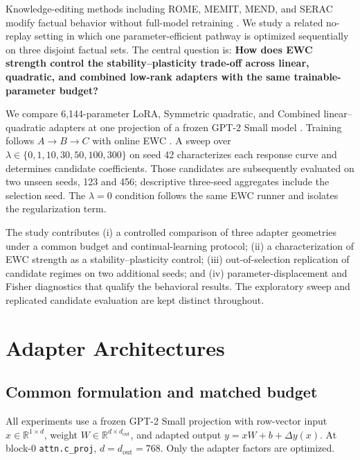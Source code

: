 \documentclass[12pt,a4paper]{article}
\begin{document}
Knowledge-editing methods including ROME, MEMIT, MEND, and SERAC modify factual behavior without full-model retraining \cite{ref9,ref10,ref11,ref12}. We study a related no-replay setting in which one parameter-efficient pathway is optimized sequentially on three disjoint factual sets. The central question is: \textbf{How does EWC strength control the stability–plasticity trade-off across linear, quadratic, and combined low-rank adapters with the same trainable-parameter budget?}

We compare 6,144-parameter LoRA, Symmetric quadratic, and Combined linear–quadratic adapters at one projection of a frozen GPT-2 Small model \cite{ref3}. Training follows \(A\rightarrow B\rightarrow C\) with online EWC \cite{ref1}. A sweep over \(\lambda\in\{0,1,10,30,50,100,300\}\) on seed 42 characterizes each response curve and determines candidate coefficients. Those candidates are subsequently evaluated on two unseen seeds, 123 and 456; descriptive three-seed aggregates include the selection seed. The \(\lambda=0\) condition follows the same EWC runner and isolates the regularization term.

The study contributes (i) a controlled comparison of three adapter geometries under a common budget and continual-learning protocol; (ii) a characterization of EWC strength as a stability–plasticity control; (iii) out-of-selection replication of candidate regimes on two additional seeds; and (iv) parameter-displacement and Fisher diagnostics that qualify the behavioral results. The exploratory sweep and replicated candidate evaluation are kept distinct throughout.

\section{Adapter Architectures}
\subsection{Common formulation and matched budget}
All experiments use a frozen GPT-2 Small projection with row-vector input \(x\in\mathbb R^{1\times d}\), weight \(W\in\mathbb R^{d\times d_{\mathrm{out}}}\), and adapted output \(y=xW+b+\Delta y(x)\). At block-0 \texttt{attn.c\_proj}, \(d=d_{\mathrm{out}}=768\). Only the adapter factors are optimized.
\end{document}
